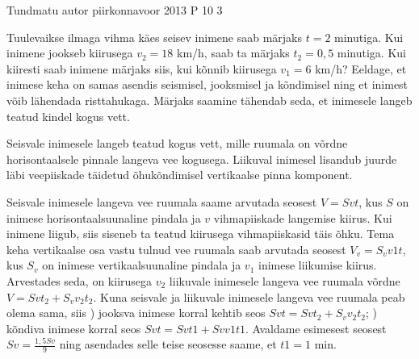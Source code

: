 {Tundmatu autor} %
{piirkonnavoor} %
{2013} %
{P 10} %
{3} %
{
\ifStatement
Tuulevaikse ilmaga vihma käes seisev inimene saab märjaks $t = 2$ minutiga. Kui inimene jookseb kiirusega $v_2 = 18$ km/h, saab ta märjaks $t_2 = 0,5$ minutiga. Kui kiiresti saab inimene märjaks siis, kui kõnnib kiirusega $v_1 = 6$ km/h? Eeldage, et inimese keha on samas asendis seismisel, jooksmisel ja kõndimisel ning et inimest võib lähendada risttahukaga. Märjaks saamine tähendab seda, et inimesele langeb teatud kindel kogus vett.
\fi

\ifHint
Seisvale inimesele langeb teatud kogus vett, mille ruumala on võrdne horisontaalsele pinnale langeva vee kogusega. Liikuval inimesel lisandub juurde läbi veepiiskade täidetud õhukõndimisel vertikaalse pinna komponent.
\fi

\ifSolution
Seisvale inimesele langeva vee ruumala saame arvutada seosest $V = Svt$, kus $S$ on inimese horisontaalsuunaline pindala ja $v$ vihmapiiskade langemise kiirus. 
\newline
Kui inimene liigub, siis siseneb ta teatud kiirusega vihmapiiskasid täis õhku. Tema keha vertikaalse osa vastu tulnud vee ruumala saab arvutada seosest $V_v = S_v v 1t$, kus $S_v$ on inimese vertikaalsuunaline pindala ja $v_1$ inimese liikumise kiirus. 
\newline
Arvestades seda, on kiirusega $v_2$ liikuvale inimesele langeva vee ruumala võrdne $V = Svt_2 + S_v v_2 t_2$. 
\newline
Kuna seisvale ja liikuvale inimesele langeva vee ruumala peab olema sama, siis 
) jooksva inimese korral kehtib seos $Svt = Svt_2 + S_v v_2 t_2$; 
) kõndiva inimese korral seos $Svt = Svt1 + Svv1t1$. 
\newline
Avaldame esimesest seosest $Sv = \frac {1,5Sv}{9} $ ning asendades selle teise seosesse saame, et $t1 = 1$ min.
\fi
}